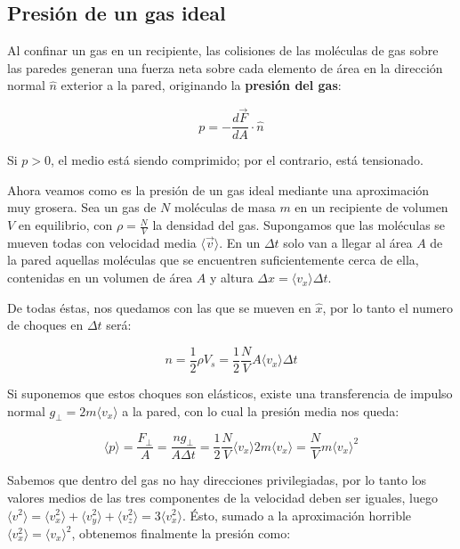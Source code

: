 \documentclass[a4paper]{article}
\begin{document}
\subsection{Presi\'on de un gas ideal}

Al confinar un gas en un recipiente, las colisiones de las mol\'eculas de gas sobre las paredes generan una fuerza neta sobre cada elemento de \'area en la direcci\'on normal $\hat{n}$ exterior a la pared, originando la \textbf{presi\'on del gas}:

$$p = -\frac{d\vec{F}}{dA} \cdot \hat{n}$$

Si $p > 0$, el medio est\'a siendo comprimido; por el contrario, est\'a tensionado.\newline

Ahora veamos como es la presi\'on de un gas ideal mediante una aproximaci\'on muy grosera. Sea un gas de $N$ mol\'eculas de masa $m$ en un recipiente de volumen $V$ en equilibrio, con $\rho = \frac{N}{V}$ la densidad del gas.
Supongamos que las mol\'eculas se mueven todas con velocidad media $\langle \vec{v} \rangle$. En un $\Delta t$ solo van a llegar al \'area $A$ de la pared aquellas mol\'eculas que se encuentren suficientemente cerca de ella, contenidas en un volumen de \'area $A$ y altura $\Delta x = \langle v_{x} \rangle \Delta t$.

De todas \'estas, nos quedamos con las que se mueven en $\hat{x}$, por lo tanto el numero de choques en $\Delta t$ ser\'a:

$$n = \frac{1}{2}\rho V_{s} = \frac{1}{2}\frac{N}{V}A \langle v_{x}\rangle \Delta t$$

Si suponemos que estos choques son el\'asticos, existe una transferencia de impulso normal $g_{\bot} = 2m \langle v_{x} \rangle$ a la pared, con lo cual la presi\'on media nos queda:

$$\langle p \rangle = \frac{F_{\bot}}{A} = \frac{ng_{\bot}}{A\Delta t} = \frac{1}{2}\frac{N}{V} \langle v_{x} \rangle 2m \langle v_{x}\rangle = \frac{N}{V}m \langle v_{x} \rangle ^{2}$$ \newline

Sabemos que dentro del gas no hay direcciones privilegiadas, por lo tanto los valores medios de las tres componentes de la velocidad deben ser iguales, luego $\langle v^{2} \rangle = \langle v_{x}^{2} \rangle + \langle v_{y}^{2} \rangle + \langle v_{z}^{2} \rangle = 3\langle v_{x}^{2} \rangle$. \'Esto, sumado a la aproximaci\'on horrible $\langle v_{x}^{2} \rangle = \langle v_{x} \rangle^{2}$, obtenemos finalmente la presi\'on como:
\end{document}
